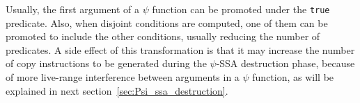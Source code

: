 \begin{itemize}








Usually, the first argument of a $\psi$ function can be promoted
under the {\tt true} predicate. Also, when disjoint conditions are
computed, one of them can be promoted to include the other conditions,
usually reducing the number of predicates. A side effect of this
transformation is that it may increase the number of copy instructions
to be generated during the $\psi$-SSA destruction phase, because of
more live-range interference between arguments in a $\psi$ function,
as will be explained in next section~\ref{sec:Psi_ssa_destruction}.

\end{itemize}

